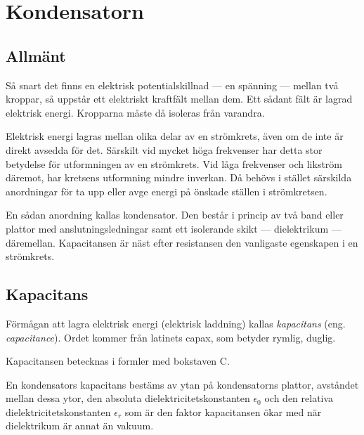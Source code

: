 \section{Kondensatorn}

\subsection{Allmänt}

Så snart det finns en elektrisk potentialskillnad --- en spänning --- mellan två
kroppar, så uppstår ett elektriskt kraftfält mellan dem. Ett sådant fält är
lagrad elektrisk energi. Kropparna måste då isoleras från varandra.

Elektrisk energi lagras mellan olika delar av en strömkrets, även om de inte är
direkt avsedda för det. Särskilt vid mycket höga frekvenser har detta stor
betydelse för utformningen av en strömkrets. Vid låga frekvenser och likström
däremot, har kretsens utformning mindre inverkan. Då behövs i stället särskilda
anordningar för ta upp eller avge energi på önskade ställen i strömkretsen.

En sådan anordning kallas kondensator. Den består i princip av två band eller
plattor med anslutningsledningar samt ett isolerande skikt --- dielektrikum ---
däremellan. Kapacitansen är näst efter resistansen den vanligaste egenskapen i
en strömkrets.

\subsection{Kapacitans}

Förmågan att lagra elektrisk energi (elektrisk laddning) kallas
\emph{kapacitans} (eng. \emph{capacitance}).
Ordet kommer från latinets capax, som betyder rymlig, duglig.

Kapacitansen betecknas i formler med bokstaven C.

En kondensators kapacitans bestäms av ytan på kondensatorns plattor, avståndet
mellan dessa ytor, den absoluta dielektricitetskonstanten \(\epsilon_0\) och den
relativa dielektricitetskonstanten \(\epsilon_r\) som är den faktor kapacitansen
ökar med när dielektrikum är annat än vakuum.

